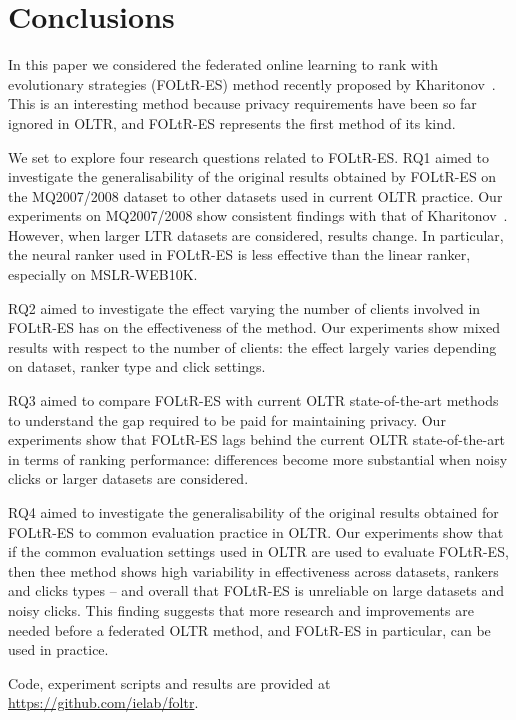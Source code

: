 \section{Conclusions}

In this paper we considered the federated online learning to rank with evolutionary strategies (FOLtR-ES) method recently proposed by Kharitonov~\cite{kharitonov2019federated}. This is an interesting method because privacy requirements have been so far ignored in OLTR, and FOLtR-ES represents the first method of its kind. 

We set to explore four research questions related to FOLtR-ES. RQ1 aimed to investigate the generalisability of the original results obtained by FOLtR-ES on the MQ2007/2008 dataset to other datasets used in current OLTR practice. Our  experiments on MQ2007/2008 show consistent findings with that of Kharitonov~\cite{kharitonov2019federated}. However, when larger LTR datasets are considered, results change. In particular, the neural ranker used in FOLtR-ES is less effective than the linear ranker, especially on MSLR-WEB10K. %

RQ2 aimed to investigate the effect varying the number of clients involved in FOLtR-ES has on the effectiveness of the method. %
Our experiments show mixed results with respect to the number of clients: the effect largely varies depending on dataset, ranker type and click settings. 

RQ3 aimed to compare FOLtR-ES with current OLTR state-of-the-art methods to understand the gap required to be paid for maintaining privacy. Our experiments show that FOLtR-ES lags behind the current OLTR state-of-the-art in terms of ranking performance: differences become more substantial when noisy clicks or larger datasets are considered. 

RQ4 aimed to investigate the generalisability of the original results obtained for FOLtR-ES to common evaluation practice in OLTR. Our experiments show that if the common evaluation settings used in OLTR are used to evaluate FOLtR-ES, then thee method shows high variability in effectiveness across datasets, rankers and clicks types -- and overall that FOLtR-ES is unreliable on large datasets and noisy clicks. This finding suggests that more research and improvements are needed before a federated OLTR method, and FOLtR-ES in particular, can be used in practice. 

Code, experiment scripts and results are provided at \url{https://github.com/ielab/foltr}. 